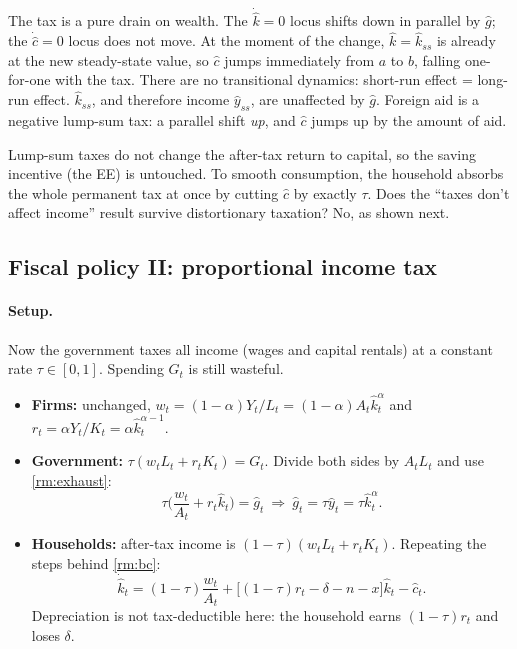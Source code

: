 \begin{keybox}[title={Permanent rise in a lump-sum tax ($\hat g=0\to\hat g>0$)}]
The tax is a pure drain on wealth. The $\dot{\hat k}=0$ locus shifts down in parallel by $\hat g$; the $\dot{\hat c}=0$ locus does not move. At the moment of the change, $\hat k=\hat k_{ss}$ is already at the new steady-state value, so $\hat c$ jumps immediately from $a$ to $b$, falling one-for-one with the tax. There are no transitional dynamics: short-run effect = long-run effect. $\hat k_{ss}$, and therefore income $\hat y_{ss}$, are unaffected by $\hat g$. Foreign aid is a negative lump-sum tax: a parallel shift \emph{up}, and $\hat c$ jumps up by the amount of aid.
\end{keybox}
\begin{tipbox}
Lump-sum taxes do not change the after-tax return to capital, so the saving incentive (the EE) is untouched. To smooth consumption, the household absorbs the whole permanent tax at once by cutting $\hat c$ by exactly $\tau$. Does the ``taxes don't affect income'' result survive distortionary taxation? No, as shown next.
\end{tipbox}

\subsection{Fiscal policy II: proportional income tax }

\paragraph{Setup.} Now the government taxes all income (wages and capital rentals) at a constant rate $\tau\in[0,1]$. Spending $G_t$ is still wasteful.
\begin{itemize}
\item \textbf{Firms:} unchanged, $w_t=(1-\alpha)Y_t/L_t=(1-\alpha)A_t\hat k_t^\alpha$ and $r_t=\alpha Y_t/K_t=\alpha\hat k_t^{\alpha-1}$.
\item \textbf{Government:} $\tau(w_tL_t+r_tK_t)=G_t$. Divide both sides by $A_tL_t$ and use \eqref{rm:exhaust}:
\[
\tau\Big(\frac{w_t}{A_t}+r_t\hat k_t\Big)=\hat g_t\ \Longrightarrow\ \hat g_t=\tau\hat y_t=\tau\hat k_t^{\alpha}.
\]
\item \textbf{Households:} after-tax income is $(1-\tau)(w_tL_t+r_tK_t)$. Repeating the steps behind \eqref{rm:bc}:
\begin{equation}
\dot{\hat k}_t=(1-\tau)\frac{w_t}{A_t}+\big[(1-\tau)r_t-\delta-n-x\big]\hat k_t-\hat c_t . \label{rm:bcpt}
\end{equation}
Depreciation is not tax-deductible here: the household earns $(1-\tau)r_t$ and loses $\delta$.
\end{itemize}

